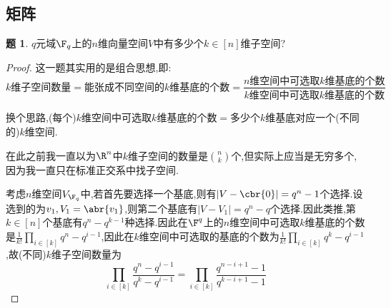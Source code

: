 \documentclass{article}
\theoremstyle{definition}
\newtheorem{exercise}{题}[section]
\begin{document}
\subsection{矩阵}
\begin{exercise}
    $q$元域$\F_q$上的$n$维向量空间$V$中有多少个$k\in [n]$维子空间?
\end{exercise}
\begin{proof}
    这一题其实用的是组合思想,即:$$k\text{维子空间数量}=\text{能张成不同空间的}k\text{维基底的个数}=\frac{n\text{维空间中可选取}k\text{维基底的个数}}{k\text{维空间中可选取}k\text{维基底的个数}}$$

    换个思路,(每个)$k$维空间中可选取$k$维基底的个数$=$多少个$k$维基底对应一个(不同的)$k$维空间.

    在此之前我一直以为$\R^n$中$k$维子空间的数量是$ \binom{n}{k}$个,但实际上应当是无穷多个,因为我一直只在标准正交系中找子空间.

    考虑$n$维空间$V_{\F_q}$中,若首先要选择一个基底,则有$|V-\cbr{0}|=q^n-1$个选择.设选到的为$v_1, V_1=\abr{v_1}$,则第二个基底有$|V-V_1|=q^n-q$个选择.因此类推,第$k\in [n]$个基底有$q^n-q^{k-1}$种选择.因此在$\F^q$上的$n$维空间中可选取$k$维基底的个数是$ \frac{1}{k!}\prod_{i\in [k]}q^n-q^{i-1}$,因此在$k$维空间中可选取的基底的个数为$ \frac{1}{k!}\prod_{i\in [k]}q^k-q^{i-1}$,故(不同)$k$维子空间数量为$$\prod_{i\in [k]}\frac{q^n-q^{i-1}}{q^k-q^{i-1}}=\prod_{i\in [k]}\frac{q^{n-i+1}-1}{q^{k-i+1}-1}$$
\end{proof}
\end{document}
